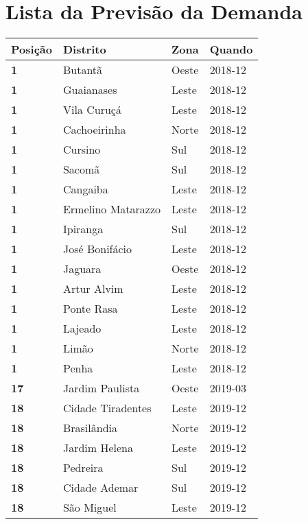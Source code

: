 \newpage

\section{Lista da Previsão da Demanda}
\begin{table}[H]
	\centering
	\begin{tabular}{l|l|l|l}
	\textbf{Posição} & \textbf{Distrito} & \textbf{Zona} & \textbf{Quando} \\ \hline
	\textbf{1} & Butantã & Oeste & 2018-12\\ \hline
	\textbf{1} & Guaianases & Leste & 2018-12\\ \hline
	\textbf{1} & Vila Curuçá & Leste & 2018-12\\ \hline
	\textbf{1} & Cachoeirinha & Norte & 2018-12\\ \hline
	\textbf{1} & Cursino & Sul & 2018-12\\ \hline
	\textbf{1} & Sacomã & Sul & 2018-12\\ \hline
	\textbf{1} & Cangaiba & Leste & 2018-12\\ \hline
	\textbf{1} & Ermelino Matarazzo & Leste & 2018-12\\ \hline
	\textbf{1} & Ipiranga & Sul & 2018-12\\ \hline
	\textbf{1} & José Bonifácio & Leste & 2018-12\\ \hline
	\textbf{1} & Jaguara & Oeste & 2018-12\\ \hline
	\textbf{1} & Artur Alvim & Leste & 2018-12\\ \hline
	\textbf{1} & Ponte Rasa & Leste & 2018-12\\ \hline
	\textbf{1} & Lajeado & Leste & 2018-12\\ \hline
	\textbf{1} & Limão & Norte & 2018-12\\ \hline
	\textbf{1} & Penha & Leste & 2018-12\\ \hline
	\textbf{17} & Jardim Paulista & Oeste & 2019-03\\ \hline
	\textbf{18} & Cidade Tiradentes & Leste & 2019-12\\ \hline
	\textbf{18} & Brasilândia & Norte & 2019-12\\ \hline
	\textbf{18} & Jardim Helena & Leste & 2019-12\\ \hline
	\textbf{18} & Pedreira & Sul & 2019-12\\ \hline
	\textbf{18} & Cidade Ademar & Sul & 2019-12\\ \hline
	\textbf{18} & São Miguel & Leste & 2019-12\\ \hline

\end{tabular}
\end{table}
